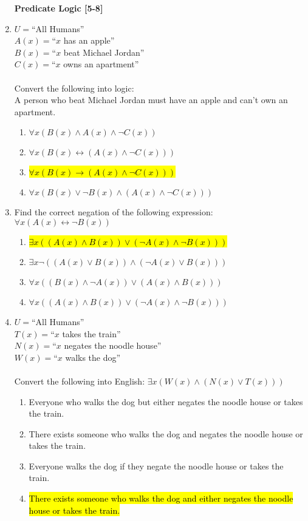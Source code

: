 \documentclass{article}
\renewcommand{\implies}{\rightarrow}
\begin{document}
\begin{enumerate}
\newpage

\textbf{Predicate Logic [5-8]}

\item $U=$``All Humans''
\\$A(x)=$``$x$ has an apple''
\\$B(x)=$``$x$ beat Michael Jordan''
\\$C(x)=$``$x$ owns an apartment''\\ 
\\Convert the following into logic:
\\A person who beat Michael Jordan must have an apple and can't own an apartment.
\begin{enumerate}
\item $\forall x(B(x)\land A(x)\land\neg C(x))$
\item $\forall x(B(x)\leftrightarrow (A(x)\land\neg C(x)))$
\item \hl{$\forall x(B(x)\implies (A(x)\land\neg C(x)))$}
\item $\forall x(B(x)\lor\neg B(x)\land (A(x)\land\neg C(x)))$
\end{enumerate}

\item Find the correct negation of the following expression: $\forall x(A(x)\leftrightarrow\neg B(x))$
\begin{enumerate}
\item \hl{$\exists x((A(x)\land B(x))\lor(\neg A(x)\land\neg B(x)))$}
\item $\exists x\neg ((A(x)\lor B(x))\land (\neg A(x)\lor B(x)))$
\item $\forall x((B(x)\land\neg A(x))\lor (A(x)\land B(x)))$
\item $\forall x((A(x)\land B(x))\lor(\neg A(x)\land\neg B(x)))$
\end{enumerate}

\item $U=$``All Humans''
\\$T(x)=$``$x$ takes the train''
\\$N(x)=$``$x$ negates the noodle house''
\\$W(x)=$``$x$ walks the dog''\\ 
\\Convert the following into English: $\exists x(W(x)\land (N(x)\lor T(x)))$
\begin{enumerate}
\item Everyone who walks the dog but either negates the noodle house or takes the train.
\item There exists someone who walks the dog and negates the noodle house or takes the train.
\item Everyone walks the dog if they negate the noodle house or takes the train.
\item \hl{There exists someone who walks the dog and either negates the noodle house or takes the train.}
\end{enumerate}


\end{enumerate}
\end{document}
